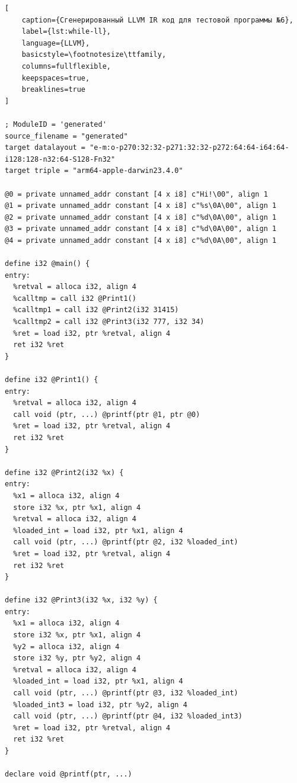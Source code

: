 \begin{lstlisting}[
    caption={Сгенерированный LLVM IR код для тестовой программы №6},
    label={lst:while-ll},
    language={LLVM},
    basicstyle=\footnotesize\ttfamily,
    columns=fullflexible,
    keepspaces=true,
    breaklines=true
]

; ModuleID = 'generated'
source_filename = "generated"
target datalayout = "e-m:o-p270:32:32-p271:32:32-p272:64:64-i64:64-i128:128-n32:64-S128-Fn32"
target triple = "arm64-apple-darwin23.4.0"

@0 = private unnamed_addr constant [4 x i8] c"Hi!\00", align 1
@1 = private unnamed_addr constant [4 x i8] c"%s\0A\00", align 1
@2 = private unnamed_addr constant [4 x i8] c"%d\0A\00", align 1
@3 = private unnamed_addr constant [4 x i8] c"%d\0A\00", align 1
@4 = private unnamed_addr constant [4 x i8] c"%d\0A\00", align 1

define i32 @main() {
entry:
  %retval = alloca i32, align 4
  %calltmp = call i32 @Print1()
  %calltmp1 = call i32 @Print2(i32 31415)
  %calltmp2 = call i32 @Print3(i32 777, i32 34)
  %ret = load i32, ptr %retval, align 4
  ret i32 %ret
}

define i32 @Print1() {
entry:
  %retval = alloca i32, align 4
  call void (ptr, ...) @printf(ptr @1, ptr @0)
  %ret = load i32, ptr %retval, align 4
  ret i32 %ret
}

define i32 @Print2(i32 %x) {
entry:
  %x1 = alloca i32, align 4
  store i32 %x, ptr %x1, align 4
  %retval = alloca i32, align 4
  %loaded_int = load i32, ptr %x1, align 4
  call void (ptr, ...) @printf(ptr @2, i32 %loaded_int)
  %ret = load i32, ptr %retval, align 4
  ret i32 %ret
}

define i32 @Print3(i32 %x, i32 %y) {
entry:
  %x1 = alloca i32, align 4
  store i32 %x, ptr %x1, align 4
  %y2 = alloca i32, align 4
  store i32 %y, ptr %y2, align 4
  %retval = alloca i32, align 4
  %loaded_int = load i32, ptr %x1, align 4
  call void (ptr, ...) @printf(ptr @3, i32 %loaded_int)
  %loaded_int3 = load i32, ptr %y2, align 4
  call void (ptr, ...) @printf(ptr @4, i32 %loaded_int3)
  %ret = load i32, ptr %retval, align 4
  ret i32 %ret
}

declare void @printf(ptr, ...)


\end{lstlisting}



